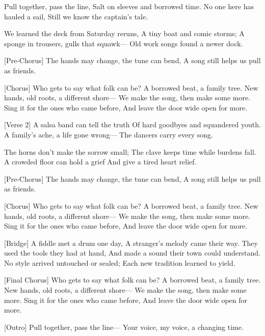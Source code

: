 \begin{lyrics}
[Verse 1]
Pull together, pass the line,
Salt on sleeves and borrowed time.
No one here has hauled a sail,
Still we know the captain’s tale.

We learned the deck from Saturday reruns,
A tiny boat and comic storms;
A sponge in trousers, gulls that squawk—
Old work songs found a newer dock.

[Pre-Chorus]
The hands may change, the tune can bend,
A song still helps us pull as friends.

[Chorus]
Who gets to say what folk can be?
A borrowed beat, a family tree.
New hands, old roots, a different shore—
We make the song, then make some more.
Sing it for the ones who came before,
And leave the door wide open for more.

[Verse 2]
A salsa band can tell the truth
Of hard goodbyes and squandered youth.
A family’s ache, a life gone wrong—
The dancers carry every song.

The horns don’t make the sorrow small;
The clave keeps time while burdens fall.
A crowded floor can hold a grief
And give a tired heart relief.

[Pre-Chorus]
The hands may change, the tune can bend,
A song still helps us pull as friends.

[Chorus]
Who gets to say what folk can be?
A borrowed beat, a family tree.
New hands, old roots, a different shore—
We make the song, then make some more.
Sing it for the ones who came before,
And leave the door wide open for more.

[Bridge]
A fiddle met a drum one day,
A stranger’s melody came their way.
They used the tools they had at hand,
And made a sound their town could understand.
No style arrived untouched or sealed;
Each new tradition learned to yield.

[Final Chorus]
Who gets to say what folk can be?
A borrowed beat, a family tree.
New hands, old roots, a different shore—
We make the song, then make some more.
Sing it for the ones who came before,
And leave the door wide open for more.

[Outro]
Pull together, pass the line—
Your voice, my voice, a changing time.
\end{lyrics}
